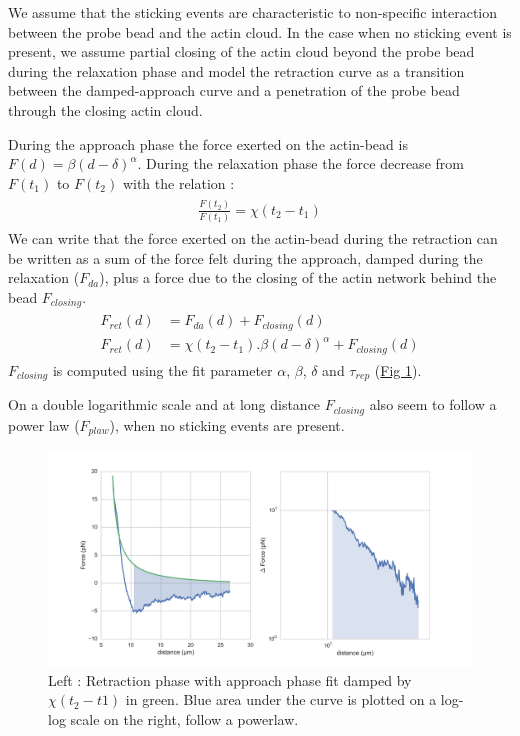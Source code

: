 \documentclass[A4paperpaper,11pt,english]{sphinxmanual}
\begin{document}
We assume that the sticking events are characteristic to non-specific interaction
between the probe bead and the actin cloud.  In the case when no sticking event
is present, we assume partial closing of the actin cloud beyond the
probe bead during the relaxation phase and model the retraction curve as a
transition between the damped-approach curve and a penetration of the probe
bead through the closing actin cloud.

During the approach phase the force exerted on the actin-bead is
\(F(d)=\beta(d-\delta)^\alpha\). During the relaxation phase the force
decrease from \(F(t_1)\) to \(F(t_2)\) with the relation :
\label{index-latex:equation-eqa311}\begin{gather}
\begin{split}\frac{F(t_2)}{F(t_1)} = \chi(t_2-t_1)\end{split}\label{index-latex-eqa311}
\end{gather}
We can write that the force exerted on the actin-bead during the retraction can
be written as a sum of the force felt during the approach, damped during the
relaxation (\(F_{da}\)), plus a force due to the closing of the actin
network behind the bead \(F_{closing}\).
\label{index-latex:equation-eqa312}\begin{gather}
\begin{split}F_{ret}(d) &= F_{da}(d) + F_{closing}(d)\\
F_{ret}(d) &= \chi(t_2-t_1).\beta(d-\delta)^\alpha+ F_{closing}(d)\end{split}\label{index-latex-eqa312}
\end{gather}
\(F_{closing}\) is computed using the fit parameter \(\alpha\), \(\beta\), \(\delta\) and \(\tau_{rep}\) (\hyperref[index-latex:retract-powerlaw]{Fig  \ref*{index-latex:retract-powerlaw}}).

On a double logarithmic scale and at long distance \(F_{closing}\) also seem to
follow a power law (\(F_{plaw}\)), when no sticking events are present.
\begin{figure}[htbp]
\centering
\capstart

\includegraphics[width=1.000\linewidth]{retract-powerlaw.png}
\caption{Left : Retraction phase with approach phase fit damped by
\(\chi(t_2-t1)\) in green. Blue area under the curve is plotted on a
log-log scale on the right, follow a powerlaw.}\label{index-latex:retract-powerlaw}\end{figure}
\end{document}
